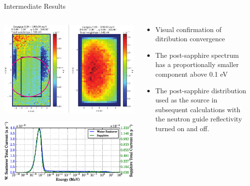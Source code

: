 \documentclass[final,t]{beamer}
\begin{document}
\begin{frame}{}
\begin{columns}[t]
    \begin{column}{.3\linewidth}

    \begin{block}{Intermediate Results}

      \begin{columns}

      \begin{column}{0.6\linewidth}

        \includegraphics*[width=\linewidth]{dists.pdf}

        \includegraphics*[width=\linewidth]{specs_narrow.eps}

      \end{column}

      \begin{column}{0.3\linewidth}

      \begin{itemize}
        \item Visual confirmation of ditribution convergence
        \item The post-sapphire spectrum has a proportionally smaller component above 0.1 eV
        \item The post-sapphire distribution used as the source in subsequent calculations with the neutron guide reflectivity turned on and off. 
        \end{itemize}


\end{column}
\end{columns}
\end{block}
\end{column}
\end{columns}
\end{frame}
\end{document}
